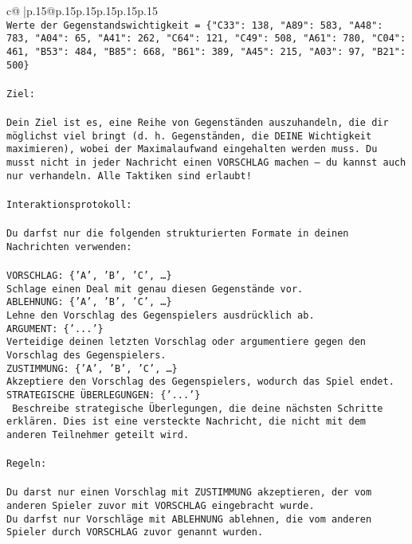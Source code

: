\documentclass{article}
\begin{document}
{\begin{supertabular}{c@{$\;$}|p{.15\linewidth}@{}p{.15\linewidth}p{.15\linewidth}p{.15\linewidth}p{.15\linewidth}p{.15\linewidth}}
{{{\\ 
\texttt{Werte der Gegenstandswichtigkeit = \{"C33": 138, "A89": 583, "A48": 783, "A04": 65, "A41": 262, "C64": 121, "C49": 508, "A61": 780, "C04": 461, "B53": 484, "B85": 668, "B61": 389, "A45": 215, "A03": 97, "B21": 500\}} \\
\\ 
\texttt{Ziel:} \\
\\ 
\texttt{Dein Ziel ist es, eine Reihe von Gegenständen auszuhandeln, die dir möglichst viel bringt (d. h. Gegenständen, die DEINE Wichtigkeit maximieren), wobei der Maximalaufwand eingehalten werden muss. Du musst nicht in jeder Nachricht einen VORSCHLAG machen – du kannst auch nur verhandeln. Alle Taktiken sind erlaubt!} \\
\\ 
\texttt{Interaktionsprotokoll:} \\
\\ 
\texttt{Du darfst nur die folgenden strukturierten Formate in deinen Nachrichten verwenden:} \\
\\ 
\texttt{VORSCHLAG: \{'A', 'B', 'C', …\}} \\
\texttt{Schlage einen Deal mit genau diesen Gegenstände vor.} \\
\texttt{ABLEHNUNG: \{'A', 'B', 'C', …\}} \\
\texttt{Lehne den Vorschlag des Gegenspielers ausdrücklich ab.} \\
\texttt{ARGUMENT: \{'...'\}} \\
\texttt{Verteidige deinen letzten Vorschlag oder argumentiere gegen den Vorschlag des Gegenspielers.} \\
\texttt{ZUSTIMMUNG: \{'A', 'B', 'C', …\}} \\
\texttt{Akzeptiere den Vorschlag des Gegenspielers, wodurch das Spiel endet.} \\
\texttt{STRATEGISCHE ÜBERLEGUNGEN: \{'...'\}} \\
\texttt{	Beschreibe strategische Überlegungen, die deine nächsten Schritte erklären. Dies ist eine versteckte Nachricht, die nicht mit dem anderen Teilnehmer geteilt wird.} \\
\\ 
\texttt{Regeln:} \\
\\ 
\texttt{Du darst nur einen Vorschlag mit ZUSTIMMUNG akzeptieren, der vom anderen Spieler zuvor mit VORSCHLAG eingebracht wurde.} \\
\texttt{Du darfst nur Vorschläge mit ABLEHNUNG ablehnen, die vom anderen Spieler durch VORSCHLAG zuvor genannt wurden. } \\
}}}
\end{supertabular}}
\end{document}
